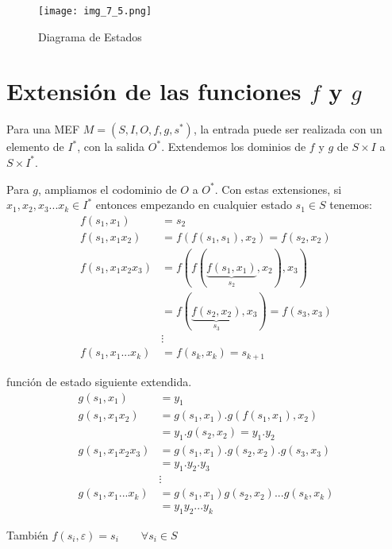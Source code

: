 \begin{figure}[h]
\centering
\texttt{[image: img\_7\_5.png]}
\caption{Diagrama de Estados}
\end{figure}

\section{Extensión de las funciones $f$ y $g$}

Para una MEF $M=(S,I,O,f,g,s^*)$, la entrada puede ser realizada con un elemento de $I^*$, con la salida $O^*$. Extendemos los dominios de $f$ y $g$ de $S\times I$ a $S\times I^*$.

Para $g$, ampliamos el codominio de $O$ a $O^*$. Con estas extensiones, si $x_1,x_2,x_3...x_k \in I^*$ entonces empezando en cualquier estado $s_1 \in S$ tenemos:
\begin{align*}
f(s_1,x_1)&=s_2	\\
f(s_1,x_1x_2)&=f(f(s_1,s_1),x_2)=f(s_2,x_2)	\\
f(s_1,x_1x_2x_3)&=f(f(\underbrace{f(s_1,x_1)}_{s_2},x_2),x_3)	\\
	&=f(\underbrace{f(s_2,x_2)}_{s_3},x_3)=f(s_3,x_3)	\\
&\vdots	\\
f(s_1,x_1...x_k)&=f(s_k,x_k)=s_{k+1}
\end{align*}

función de estado siguiente extendida.
\begin{align*}
g(s_1,x_1)&=y_1\\
g(s_1,x_1x_2)&=g(s_1,x_1).g(f(s_1,x_1),x_2)\\
&=y_1.g(s_2,x_2)=y_1.y_2\\
g(s_1,x_1x_2x_3)&=g(s_1,x_1).g(s_2,x_2).g(s_3,x_3)\\
&=y_1.y_2.y_3\\
&\vdots\\
g(s_1,x_1...x_k)&=g(s_1,x_1)g(s_2,x_2)...g(s_k,x_k)\\
&=y_1y_2...y_k
\end{align*}

También $f(s_i,\varepsilon)=s_i \qquad \forall s_i \in S$